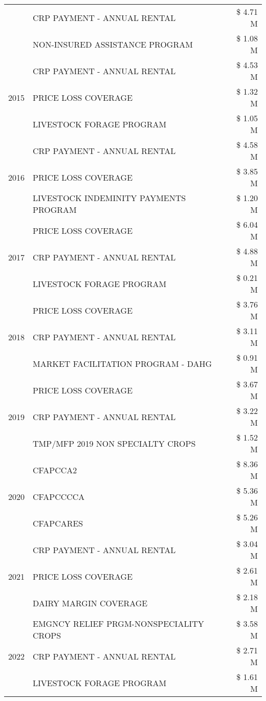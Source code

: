 \begin{tabular}{llr}
 & CRP PAYMENT - ANNUAL RENTAL & \$ 4.71 M \\
 & NON-INSURED ASSISTANCE PROGRAM & \$ 1.08 M \\
\cline{1-3}
\multirow[t]{3}{*}{2015} & CRP PAYMENT - ANNUAL RENTAL & \$ 4.53 M \\
 & PRICE LOSS COVERAGE & \$ 1.32 M \\
 & LIVESTOCK FORAGE PROGRAM & \$ 1.05 M \\
\cline{1-3}
\multirow[t]{3}{*}{2016} & CRP PAYMENT - ANNUAL RENTAL & \$ 4.58 M \\
 & PRICE LOSS COVERAGE & \$ 3.85 M \\
 & LIVESTOCK INDEMINITY PAYMENTS PROGRAM & \$ 1.20 M \\
\cline{1-3}
\multirow[t]{3}{*}{2017} & PRICE LOSS COVERAGE & \$ 6.04 M \\
 & CRP PAYMENT - ANNUAL RENTAL & \$ 4.88 M \\
 & LIVESTOCK FORAGE PROGRAM & \$ 0.21 M \\
\cline{1-3}
\multirow[t]{3}{*}{2018} & PRICE LOSS COVERAGE & \$ 3.76 M \\
 & CRP PAYMENT - ANNUAL RENTAL & \$ 3.11 M \\
 & MARKET FACILITATION PROGRAM - DAHG & \$ 0.91 M \\
\cline{1-3}
\multirow[t]{3}{*}{2019} & PRICE LOSS COVERAGE & \$ 3.67 M \\
 & CRP PAYMENT - ANNUAL RENTAL & \$ 3.22 M \\
 & TMP/MFP 2019 NON SPECIALTY CROPS & \$ 1.52 M \\
\cline{1-3}
\multirow[t]{3}{*}{2020} & CFAPCCA2 & \$ 8.36 M \\
 & CFAPCCCCA & \$ 5.36 M \\
 & CFAPCARES & \$ 5.26 M \\
\cline{1-3}
\multirow[t]{3}{*}{2021} & CRP PAYMENT - ANNUAL RENTAL & \$ 3.04 M \\
 & PRICE LOSS COVERAGE & \$ 2.61 M \\
 & DAIRY MARGIN COVERAGE & \$ 2.18 M \\
\cline{1-3}
\multirow[t]{3}{*}{2022} & EMGNCY RELIEF PRGM-NONSPECIALITY CROPS & \$ 3.58 M \\
 & CRP PAYMENT - ANNUAL RENTAL & \$ 2.71 M \\
 & LIVESTOCK FORAGE PROGRAM & \$ 1.61 M \\
\cline{1-3}
\bottomrule
\end{tabular}

